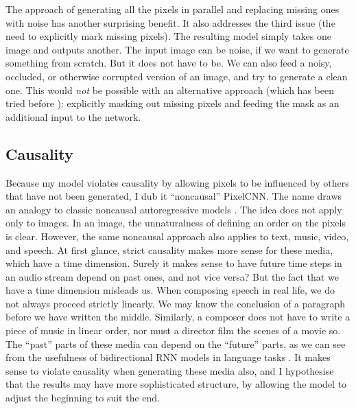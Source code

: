 \documentclass[11pt, a4paper, openany]{book}
\newcommand{\nquote}[1]{``{#1}''}
\begin{document}
The approach of generating all the pixels in parallel and replacing missing ones with noise has another surprising benefit. It also addresses the third issue (the need to explicitly mark missing pixels). The resulting model simply takes one image and outputs another. The input image can be noise, if we want to generate something from scratch. But it does not have to be. We can also feed a noisy, occluded, or otherwise corrupted version of an image, and try to generate a clean one. This would \emph{not} be possible with an alternative approach (which has been tried before \citep{dnade,gsnnade}): explicitly masking out missing pixels and feeding the mask as an additional input to the network.

\subsection{Causality}

Because my model violates causality by allowing pixels to be influenced by others that have not been generated, I dub it \nquote{noncausal} PixelCNN. The name draws an analogy to classic noncausal autoregressive models \citep{noncausalimage2,noncausaleco2}. The idea does not apply only to images. In an image, the unnaturalness of defining an order on the pixels is clear. However, the same noncausal approach also applies to text, music, video, and speech. At first glance, strict causality makes more sense for these media, which have a time dimension. Surely it makes sense to have future time steps in an audio stream depend on past ones, and not vice versa? But the fact that we have a time dimension misleads us. When composing speech in real life, we do not always proceed strictly linearly. We may know the conclusion of a paragraph before we have written the middle. Similarly, a composer does not have to write a piece of music in linear order, nor must a director film the scenes of a movie so. The \nquote{past} parts of these media can depend on the \nquote{future} parts, as we can see from the usefulness of bidirectional RNN models in language tasks \citep{brnnuse1,brnnuse2,brnnuse3}. It makes sense to violate causality when generating these media also, and I hypothesise that the results may have more sophisticated structure, by allowing the model to adjust the beginning to suit the end.
\end{document}
